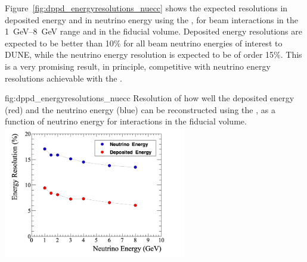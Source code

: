 Figure~\ref{fig:dppd_energyresolutions_nuecc} shows the expected resolutions in deposited  energy and in neutrino  energy using the , for beam \nue {} interactions in the \SIrange{1}{8}{GeV} range and in the  fiducial volume. Deposited energy resolutions are expected to be better than \num{10}\% for all beam neutrino energies of interest to DUNE, while the neutrino energy resolution is expected to be of order \num{15}\%. This is a very promising result, in principle, competitive with neutrino energy resolutions achievable with the .

\begin{dunefigure}{fig:dppd_energyresolutions_nuecc}
{Resolution of how well the deposited energy (red) and the neutrino energy (blue) can be reconstructed using the , as a function of neutrino energy for \nue {} interactions in the \lar fiducial volume.}
\includegraphics[width=0.60\textwidth]{graphics/dppd_energyresolutions_nuecc.png}
\end{dunefigure}
